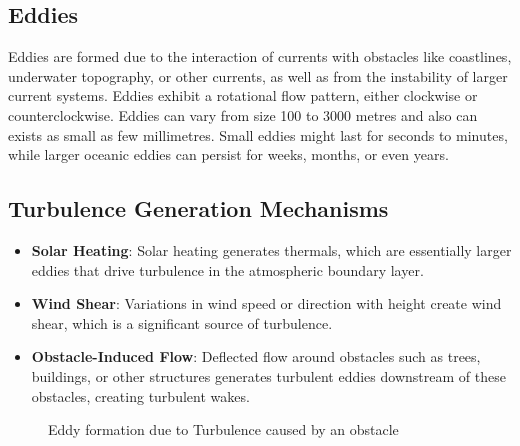 \documentclass[fleqn,10pt]{SelfArx} %
\begin{document}
\subsection{Eddies}
Eddies are formed due to the interaction of currents with obstacles like coastlines, underwater topography, or other currents, as well as from the instability of larger current systems.
Eddies exhibit a rotational flow pattern, either clockwise or counterclockwise.
Eddies can vary from size 100 to 3000 metres and also can exists as small as few millimetres.
Small eddies might last for seconds to minutes, while larger oceanic eddies can persist for weeks, months, or even years.

\subsection{Turbulence Generation Mechanisms}
\begin{itemize} [noitemsep]
	\item \textbf{Solar Heating}: Solar heating generates thermals, which are essentially larger eddies that drive turbulence in the atmospheric boundary layer.
	\item \textbf{Wind Shear}: Variations in wind speed or direction with height create wind shear, which is a significant source of turbulence.
	\item \textbf{Obstacle-Induced Flow}: Deflected flow around obstacles such as trees, buildings, or other structures generates turbulent eddies downstream of these obstacles, creating turbulent wakes.
\end{itemize}

\begin{figure}[ht!]
	\centering
	\renewcommand{\thefigure}{1.3}
	\caption{Eddy formation due to Turbulence caused by an obstacle}
\end{figure}
\end{document}
